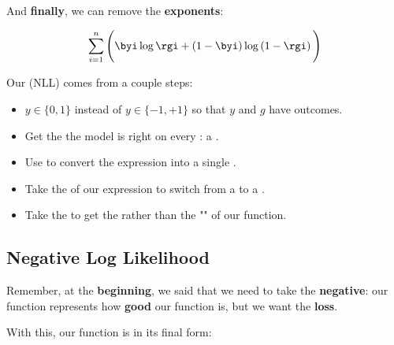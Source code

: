         And \textbf{finally}, we can remove the \textbf{exponents}:
        
        \begin{equation}
            \sum_{i = 1}^n
            \Bigg(
                \byi\log{\rgi}
                +
                \left( 1 - \byi \right)
                \log
                    \left( 1 - \rgi \right) 
            \Bigg)
        \end{equation}
    
        \begin{concept}
            Our  (NLL) comes from a couple steps:
            
            \begin{itemize}
                \item {} $y \in \{0, 1\}$ instead of $y \in \{-1,+1\}$ so that $y$ and $g$ have  outcomes.
            
                \item Get the  the model is right on every : a .
                
                \item Use  to convert the  expression into a single .
                
                \item Take the  of our expression to switch from a  to a .
                
                \item Take the  to get the  rather than the "" of our function.
            \end{itemize}
        \end{concept}    
        
    \subsection*{Negative Log Likelihood}
    
        Remember, at the \textbf{beginning}, we said that we need to take the \textbf{negative}: our function represents how \textbf{good} our function is, but we want the \textbf{loss}.
        
        With this, our function is in its final form:\\
        
